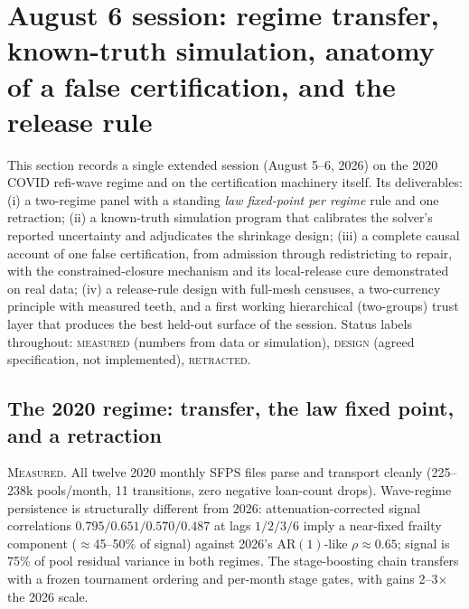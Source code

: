 \section{August 6 session: regime transfer, known-truth simulation, anatomy of a false certification, and the release rule}\label{sec:aug6}

This section records a single extended session (August 5--6, 2026) on the 2020
COVID refi-wave regime and on the certification machinery itself. Its
deliverables: (i) a two-regime panel with a standing \emph{law fixed-point per
regime} rule and one retraction; (ii) a known-truth simulation program that
calibrates the solver's reported uncertainty and adjudicates the shrinkage
design; (iii) a complete causal account of one false certification, from
admission through redistricting to repair, with the constrained-closure
mechanism and its local-release cure demonstrated on real data; (iv) a
release-rule design with full-mesh censuses, a two-currency principle with
measured teeth, and a first working hierarchical (two-groups) trust layer that
produces the best held-out surface of the session. Status labels throughout:
\textsc{measured} (numbers from data or simulation), \textsc{design} (agreed
specification, not implemented), \textsc{retracted}.

\subsection{The 2020 regime: transfer, the law fixed point, and a retraction}
\label{sec:aug6-regime}

\textsc{Measured.} All twelve 2020 monthly SFPS files parse and transport
cleanly (225--238k pools/month, 11 transitions, zero negative loan-count
drops). Wave-regime persistence is structurally different from 2026:
attenuation-corrected signal correlations $0.795/0.651/0.570/0.487$ at lags
$1/2/3/6$ imply a near-fixed frailty component ($\approx$45--50\% of signal)
against 2026's AR$(1)$-like $\rho\approx0.65$; signal is 75\% of pool residual
variance in both regimes. The stage-boosting chain transfers with a frozen
tournament ordering and per-month stage gates, with gains 2--3$\times$ the
2026 scale.

